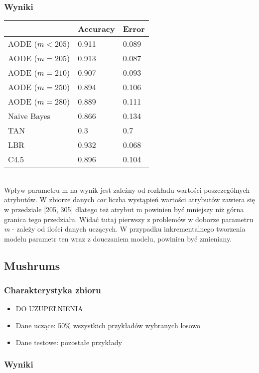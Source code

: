 \documentclass[16]{article}
\begin{document}
\subsubsection{Wyniki}
\begin{tabular}{ |l|l|l| }
\hline
	 &  Accuracy & Error
 \\ \hline
 AODE ($m < 205$) & 0.911 & 0.089
 \\ \hline
 AODE ($m = 205$) &  0.913 & 0.087
 \\ \hline
 AODE ($m = 210$) & 0.907 & 0.093
 \\ \hline
 AODE ($m = 250$) & 0.894 & 0.106
 \\ \hline
 AODE ($m = 280$) & 0.889 & 0.111
 \\ \hline
  Naive Bayes & 0.866 & 0.134
 \\ \hline
 TAN & 0.3 & 0.7
 \\ \hline
 LBR & 0.932 & 0.068
 \\ \hline
 C4.5 & 0.896 & 0.104
 \\ \hline
\end{tabular}\\

Wpływ parametru m na wynik jest zależny od rozkładu wartości poszczególnych atrybutów. W zbiorze danych \textit{car} liczba wystąpień wartości atrybutów zawiera się w przedziale [205, 305] dlatego też atrybut m powinien być mniejszy niż górna granica tego przedziału. Widać tutaj pierwszy z problemów w doborze parametru \textit{m} - zależy od ilości danych uczących. W przypadku inkrementalnego tworzenia modelu parametr ten wraz z douczaniem modelu, powinien być zmieniany. 


\subsection{Mushrums}
\subsubsection{Charakterystyka zbioru}
\begin{itemize}
	
	\item {\LARGE DO UZUPEŁNIENIA }
	
	\item Dane uczące: 50\% wszystkich przykładów wybranych losowo 
	\item Dane testowe: pozostałe przykłady
\end{itemize}

\subsubsection{Wyniki}
\end{document}

